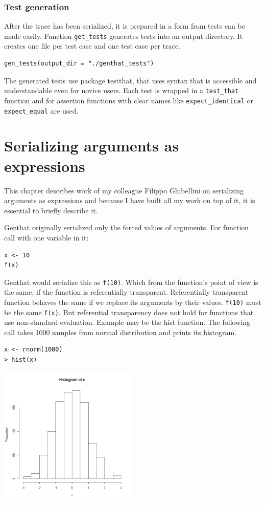 \documentclass[thesis=B,english]{FITthesis}[2012/10/20]
\begin{document}
\subsection{Test generation}
After the trace has been serialized, it is prepared in a form from tests can be made easily. Function \verb|get_tests| generates tests into an output directory. It creates one file per test case and one test case per trace. 

\begin{verbatim}
gen_tests(output_dir = "./genthat_tests")
\end{verbatim}

The generated tests use package testthat, that uses syntax that is accessible and understandable even for novice users. Each test is wrapped in a \verb|test_that| function and for assertion functions with clear names like \verb|expect_identical| or \verb|expect_equal| are used.


\chapter{Serializing arguments as expressions}
This chapter describes work of my colleague Filippo Ghibellini on serializing arguments as expressions and because I have built all my work on top of it, it is essential to briefly describe it.

Genthat originally serialized only the forced values of arguments. For function call with one variable in it:

\begin{verbatim}
x <- 10
f(x)
\end{verbatim}

Genthat would serialize this as \verb|f(10)|. Which from the function’s point of view is the same, if the function is referentially transparent. Referentially transparent function behaves the same if we replace its arguments by their values. \verb|f(10)| must be the same \verb|f(x)|. But referential transparency does not hold for functions that use non-standard evaluation. Example may be the hist function. The following call takes 1000 samples from normal distribution and prints its histogram.

\begin{verbatim}
x <- rnorm(1000)
> hist(x)
\end{verbatim}

\includegraphics[width=0.5\textwidth]{img/hist.png}
\end{document}
